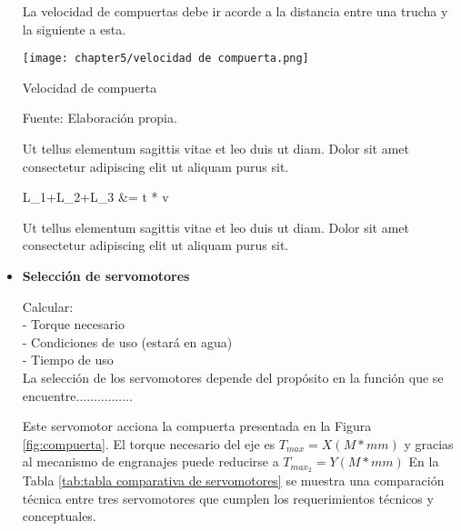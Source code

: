 \begin{itemize}
	La velocidad de compuertas debe ir acorde a la distancia entre una trucha y la siguiente a esta. 
	
	\begin{myfigure}[H]
		\centering
		\texttt{[image: chapter5/velocidad de compuerta.png]}
		\caption{Velocidad de compuerta}
		\begin{myflushleftportland}
			Fuente: Elaboración propia.
		\end{myflushleftportland}
		\label{fig:velocidad de compuerta}
	\end{myfigure}

	Ut tellus elementum sagittis vitae et leo duis ut diam. Dolor sit amet consectetur adipiscing elit ut aliquam purus sit. 
	
	\begin{myequation}\label{eq:calculo de tiempo necesario}
		\begin{split}
			L_1+L_2+L_3 &= t * v
		\end{split}		
	\end{myequation}

	Ut tellus elementum sagittis vitae et leo duis ut diam. Dolor sit amet consectetur adipiscing elit ut aliquam purus sit. 

	
	\item \textbf{Selección de servomotores}
		
	Calcular: \\
	- Torque necesario \\
	- Condiciones de uso (estará en agua) \\
	- Tiempo de uso \\
	
	La selección de los servomotores depende del propósito en la función que se encuentre................
	
	Este servomotor acciona la compuerta presentada en la Figura \ref{fig:compuerta}. El torque necesario del eje es $T_{max}=X (M*mm)$  y gracias al mecanismo de engranajes puede reducirse a $T_{max_2}=Y (M*mm)$ En la Tabla \ref{tab:tabla comparativa de servomotores} se muestra una comparación técnica entre tres servomotores que cumplen los requerimientos técnicos y conceptuales.
	

\end{itemize}
